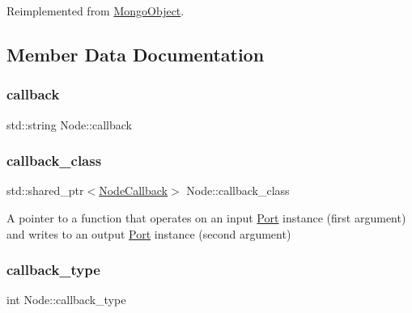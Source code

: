 Reimplemented from \hyperlink{class_mongo_object_a65971bad07dce8b649820f9dee5d0ae8}{Mongo\+Object}.



\subsection{Member Data Documentation}
\mbox{\label{class_node_a3755609fd44cf5b86c8a7d1f94d9747b}} 
\subsubsection{\texorpdfstring{callback}{callback}}
{\footnotesize\ttfamily std\+::string Node\+::callback\hspace{0.3cm}{\ttfamily [protected]}}

\mbox{\label{class_node_a9bc5e92a6565a4addbbcadea93889e85}} 
\subsubsection{\texorpdfstring{callback\+\_\+class}{callback\_class}}
{\footnotesize\ttfamily std\+::shared\+\_\+ptr$<$\hyperlink{class_node_callback}{Node\+Callback}$>$ Node\+::callback\+\_\+class}

A pointer to a function that operates on an input \hyperlink{class_port}{Port} instance (first argument) and writes to an output \hyperlink{class_port}{Port} instance (second argument) \mbox{\label{class_node_a290c95a63ae639d150355764ea1f4b54}} 
\subsubsection{\texorpdfstring{callback\+\_\+type}{callback\_type}}
{\footnotesize\ttfamily int Node\+::callback\+\_\+type\hspace{0.3cm}{\ttfamily [protected]}}

\mbox{\label{class_node_aa6465260fcaaecbb7bc8847dbbeb3ba6}} 
